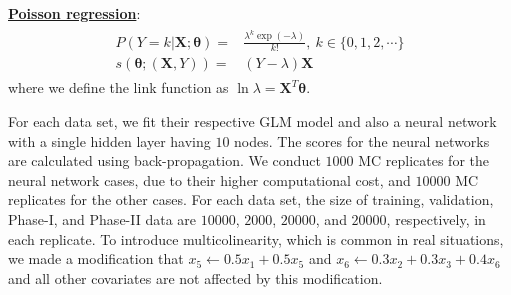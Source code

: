 \documentclass[twoside,11pt]{article}
\begin{document}
\begin{appendices}
\noindent
\underline{\textbf{Poisson regression}}:
\begin{align}
\begin{aligned}
P(Y=k|\bm{X};\bm{\theta})=&\frac{ \lambda ^{k} \exp(- \lambda)}{k!}, ~ k \in \{0,1,2,\cdots\} \\
s(\bm { \theta};(\bm {X}, Y))=& (Y- \lambda)\bm {X}
\end{aligned}
\label{eqn:pois_score}
\end{align}
where we define the link function as $\ln \lambda = \bm {X}^T\bm{\theta}$.

For each data set, we fit their respective GLM model and also a neural network with a single hidden layer having $10$ nodes. The scores for the neural networks are calculated using back-propagation. We conduct $1000$ MC replicates for the neural network cases, due to their higher computational cost, and $10000$ MC replicates for the other cases.
For each data set, the size of training, validation, Phase-I, and Phase-II data are $10000$, $2000$, $20000$, and $20000$, respectively, in each replicate. 
To introduce multicolinearity, which is common in real situations, we made a modification that $x_5 \leftarrow 0.5x_1+0.5x_5$ and $x_6 \leftarrow 0.3x_2+0.3x_3+0.4x_6$ and all other covariates are not affected by this modification.


\end{appendices}
\end{document}

